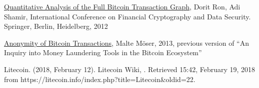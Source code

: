 \begin{thebibliography}{1}
\href{http://arimoto.lolipop.jp/584.pdf}{Quantitative Analysis of the Full
Bitcoin Transaction Graph}, Dorit Ron, Adi Shamir, International Conference on
Financial Cryptography and Data Security. Springer, Berlin, Heidelberg, 2012

\bibitem{}
\href{https://www.wi.uni-muenster.de/sites/wi/files/public/department/itsecurity/mbc13/mbc13-moeser-paper.pdf}
{Anonymity of Bitcoin Transactions}, Malte Möser, 2013, previous version of
``An Inquiry into Money Laundering Tools in the Bitcoin Ecosystem''

Litecoin. (2018, February 12). Litecoin Wiki, . Retrieved
15:42, February 19, 2018
from https://litecoin.info/index.php?title=Litecoin&oldid=22. 

\end{thebibliography}

